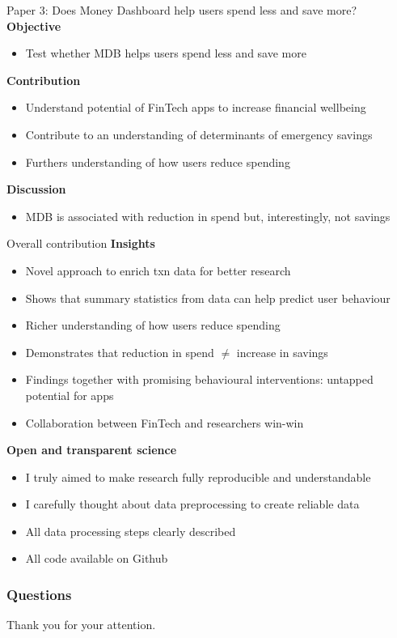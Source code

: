 \documentclass[xcolor=svgnames]{beamer}
\begin{document}
\begin{frame}{Paper 3: Does Money Dashboard help users spend less and save more?}
    \textbf{Objective}
    \begin{itemize}
        \item Test whether MDB helps users spend less and save more
    \end{itemize}
    \textbf{Contribution}
    \begin{itemize}
        \item Understand potential of FinTech apps to increase financial wellbeing
        \item Contribute to an understanding of determinants of emergency savings
        \item Furthers understanding of how users reduce spending
    \end{itemize}
    \textbf{Discussion}
    \begin{itemize}
        \item MDB is associated with reduction in spend but, interestingly, not savings
    \end{itemize}
\end{frame}

\begin{frame}{Overall contribution}
    \textbf{Insights}
    \begin{itemize}
        \item Novel approach to enrich txn data for better research
        \item Shows that summary statistics from data can help predict user behaviour
        \item Richer understanding of how users reduce spending
        \item Demonstrates that reduction in spend $\neq$ increase in savings
        \item Findings together with promising behavioural interventions: untapped potential for apps
        \item Collaboration between FinTech and researchers win-win 
    \end{itemize}
    \textbf{Open and transparent science}
    \begin{itemize}        
        \item I truly aimed to make research fully reproducible and understandable
        \item I carefully thought about data preprocessing to create reliable data
        \item All data processing steps clearly described
        \item All code available on Github
    \end{itemize}
\end{frame}




\begin{frame}\frametitle{Questions}
    Thank you for your attention.
\end{frame}
\end{document}
